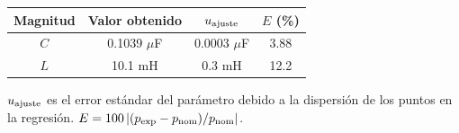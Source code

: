 \begin{center}
\begin{minipage}{\linewidth}\centering
\small
\setlength{\tabcolsep}{5pt}
\label{tab:ajustes}
\begin{tabular}{cccc}
\toprule
Magnitud & Valor obtenido & $u_{\rm ajuste}$ & $E$ (\%) \\
\midrule
$C$ & \num{0.1039} $\mu$F & \num{0.0003} $\mu$F & \num{3.88} \\
$L$ & \num{10.1} mH & \num{0.3} mH & \num{12.2} \\
\bottomrule
\end{tabular}
\par\vspace{3pt}\begin{minipage}{.96\linewidth}\footnotesize $u_{\rm ajuste}$ es el error estándar del parámetro debido a la dispersión de los puntos en la regresión. $E=100\left|(p_{\rm exp}-p_{\rm nom})/p_{\rm nom}\right|$.\end{minipage}
\end{minipage}
\end{center}
